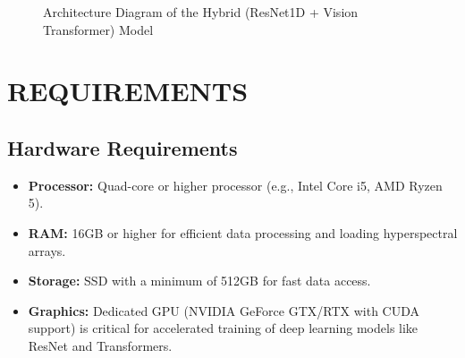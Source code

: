 \documentclass[ 12pt,a4paper,twocolumn,fleqn]{report}
\begin{document}
\begin{figure}[H]
    \vspace{2mm}
    \caption{Architecture Diagram of the Hybrid (ResNet1D + Vision Transformer) Model}
    \label{fig:hybrid_arch}
\end{figure}

\chapter{REQUIREMENTS}
\section{Hardware Requirements}
\vspace{2mm}
\begin{itemize}
    \item \textbf{Processor:} Quad-core or higher processor (e.g., Intel Core i5, AMD Ryzen 5).
    \item \textbf{RAM:} 16GB or higher for efficient data processing and loading hyperspectral arrays.
    \item \textbf{Storage:} SSD with a minimum of 512GB for fast data access.
    \item \textbf{Graphics:} Dedicated GPU (NVIDIA GeForce GTX/RTX with CUDA support) is critical for accelerated training of deep learning models like ResNet and Transformers.
\end{itemize}
\end{document}
